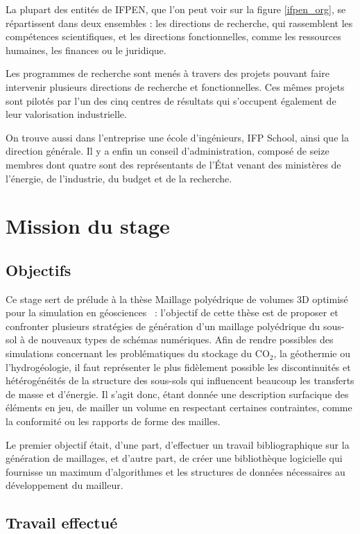 \documentclass[12pt,a4paper]{report}
\begin{document}
La plupart des entités de IFPEN, que l'on peut voir sur la figure \ref{ifpen_org}, se répartissent dans deux ensembles : les directions de recherche, qui rassemblent les compétences scientifiques, et les directions fonctionnelles, comme les ressources humaines, les finances ou le juridique.

Les programmes de recherche sont menés à travers des projets pouvant faire intervenir plusieurs directions de recherche et fonctionnelles. Ces mêmes projets sont pilotés par l'un des cinq centres de résultats qui s'occupent également de leur valorisation industrielle.

On trouve aussi dans l'entreprise une école d'ingénieurs, IFP School, ainsi que la direction générale. Il y a enfin un conseil d'administration, composé de seize membres dont quatre sont des représentants de l'\'Etat venant des ministères de l'énergie, de l'industrie, du budget et de la recherche.

\newpage
\section{Mission du stage}

\subsection{Objectifs}

Ce stage sert de prélude à la thèse \og Maillage polyédrique de volumes 3D optimisé pour la simulation en géosciences \fg{}~: l'objectif de cette thèse est de proposer et confronter plusieurs stratégies de génération d'un maillage polyédrique du sous-sol à de nouveaux types de schémas numériques. Afin de rendre possibles des simulations concernant les problématiques du stockage du CO$_2$, la géothermie ou l'hydrogéologie, il faut représenter le plus fidèlement possible les discontinuités et hétérogénéités de la structure des sous-sols qui influencent beaucoup les transferts de masse et d'énergie. Il s'agit donc, étant donnée une description surfacique des éléments en jeu, de mailler un volume en respectant certaines contraintes, comme la conformité ou les rapports de forme des mailles.

Le premier objectif était, d'une part, d'effectuer un travail bibliographique sur la génération de maillages, et d'autre part, de créer une bibliothèque logicielle qui fournisse un maximum d'algorithmes et les structures de données nécessaires au développement du mailleur.

\subsection{Travail effectué}
\end{document}
